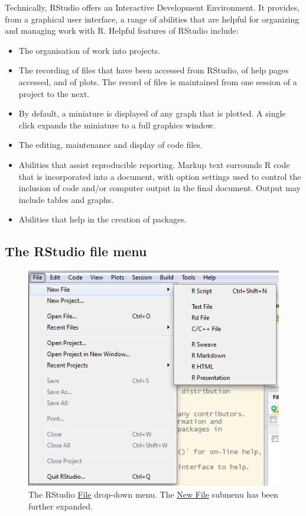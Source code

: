 Technically, 
RStudio offers an Interactive Development Environment.  It
provides, from a graphical user interface, a range of abilities that
are helpful for organizing and managing work with R.  Helpful features
of RStudio include:
\begin{itemize}
\item The organisation of work into projects.
\item The recording of files that have been accessed from RStudio, of
  help pages accessed, and of plots.  The record of files is
  maintained from one session of a project to the next.
\item By default, a miniature is displayed of any graph that is
  plotted.  A single click expands the miniature to a full graphics
  window.
\item The editing, maintenance and display of code files.
\item Abilities that assist reproducible reporting.
     Markup text
  surrounds R code that is incorporated into a document, with option
  settings used to control the inclusion of code and/or computer
  output in the final document. Output may include tables and graphs.
\item Abilities that help in the creation of packages.
\end{itemize}

\subsection{The RStudio file menu}

\begin{figure}
\includegraphics{figs-inc/03i-menu.png}
\caption{The RStudio \underline{File} drop-down menu.  The
  \underline{New File} submenu has been further expanded.}\label{fig:file-menu}
\end{figure}

